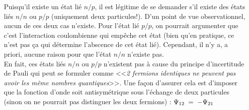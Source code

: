 Puisqu'il existe un état lié $n/p$, il est légitime de se demander s'il existe des états liés $n/n$ ou $p/p$ (uniquement deux particules!). D'un point de vue observationnel, aucun de ces deux cas n'existe. Pour l'état lié $p/p$, on pourrait argumenter que c'est l'interaction coulombienne qui empêche cet état (bien qu'en pratique, ce n'est pas ça qui détermine l'abscence de cet état lié). Cependant, il n'y a, a priori, aucune raison pour que l'état $n/n$ n'existe pas.\\
En fait, ces états liés $n/n$ ou $p/p$ n'existent pas à cause du principe d'incertitude de Pauli qui peut se formuler comme <<\textit{2 fermions identiques ne peuvent pas avoir les même nombres quantiques}>>. Une façon d'assurer cela est d'imposer que la fonction d'onde soit antisymétrique sous l'échange de deux particules (sinon on ne pourrait pas distinguer les deux fermions) : $\Psi_{12} \; = \; -\Psi_{21}$\\

